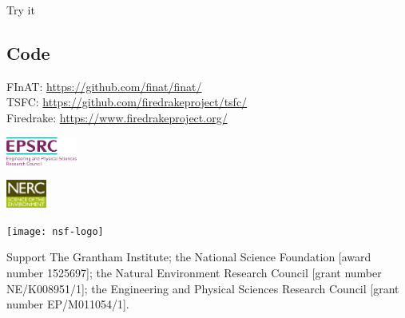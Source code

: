 \documentclass[a0paper,portrait]{baposter}
\begin{document}
\begin{poster}
\begin{posterbox}[name=try, column=3, below=curl-curl,
    span=3]{Try it}
    \subsection*{Code}
    \vspace{-0.5em}
    FInAT: \url{https://github.com/finat/finat/}\\
    TSFC: \url{https://github.com/firedrakeproject/tsfc/}\\
    Firedrake: \url{https://www.firedrakeproject.org/}

    \vspace{\baselineskip}
    \begin{minipage}{0.167\textwidth}
      \begin{flushleft}
        \includegraphics[align=c,height=2.5em]{epsrc-logo}
      \end{flushleft}
    \end{minipage}
    \hfill
    \begin{minipage}{0.167\textwidth}
      \begin{center}
        \includegraphics[align=c,height=2.5em]{nerc-logo}
      \end{center}
    \end{minipage}
    \hfill
    \begin{minipage}{0.167\textwidth}
      \begin{flushright}
        \texttt{[image: nsf-logo]}
      \end{flushright}
    \end{minipage}
  \end{posterbox}
  \begin{posterbox}[name=acknowledgements,
    column=0,span=6,below=future,boxheaderheight=2em]{Support}
    The Grantham Institute; the National Science Foundation [award number 1525697]; the Natural Environment
    Research Council [grant number NE/K008951/1]; the Engineering and
    Physical Sciences Research Council [grant number EP/M011054/1].
  \end{posterbox}
\end{poster}
\end{document}
